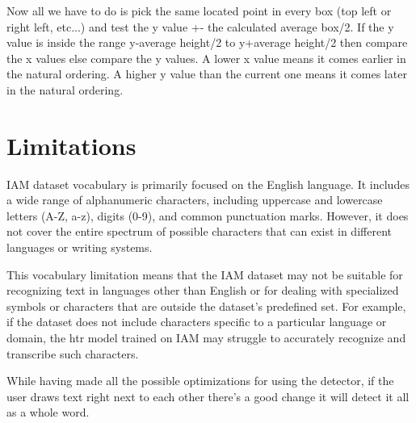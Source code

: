 Now all we have to do is pick the same located point in every box (top left or right left, etc...) and test the y value +- the calculated average box/2. If the y value is inside the range y-average height/2 to y+average height/2 then compare the x values else compare the y values. A lower x value means it comes earlier in the natural ordering. A higher y value than the current one means it comes later in the natural ordering. 

\section{Limitations}
IAM dataset vocabulary is primarily focused on the English language. It includes a wide range of alphanumeric characters, including uppercase and lowercase letters (A-Z, a-z), digits (0-9), and common punctuation marks. However, it does not cover the entire spectrum of possible characters that can exist in different languages or writing systems.

This vocabulary limitation means that the IAM dataset may not be suitable for recognizing text in languages other than English or for dealing with specialized symbols or characters that are outside the dataset's predefined set. For example, if the dataset does not include characters specific to a particular language or domain, the \gls{htr} model trained on IAM may struggle to accurately recognize and transcribe such characters.

While having made all the possible optimizations for using the detector, if the user draws text right next to each other there's a good change it will detect it all as a whole word.